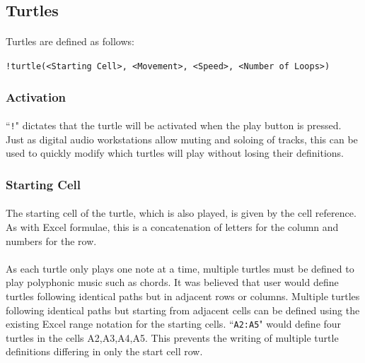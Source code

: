 \subsection{Turtles}

\paragraph{} Turtles are defined as follows:

\texttt{!turtle(<Starting Cell>, <Movement>, <Speed>, <Number of Loops>)}

\subsubsection{Activation}

\paragraph{} ``\texttt{!}" dictates that the turtle will be activated when the play button is pressed. Just as digital audio workstations allow muting and soloing of tracks, this can be used to quickly modify which turtles will play without losing their definitions.

\subsubsection{Starting Cell}

\paragraph{} The starting cell of the turtle, which is also played, is given by the cell reference. As with Excel formulae, this is a concatenation of letters for the column and numbers for the row.

\paragraph{} As each turtle only plays one note at a time, multiple turtles must be defined to play polyphonic music such as chords. It was believed that user would define turtles following identical paths but in adjacent rows or columns. Multiple turtles following identical paths but starting from adjacent cells can be defined using the existing Excel range notation for the starting cells. ``\texttt{A2:A5}" would define four turtles in the cells A2,A3,A4,A5. This prevents the writing of multiple turtle definitions differing in only the start cell row.

